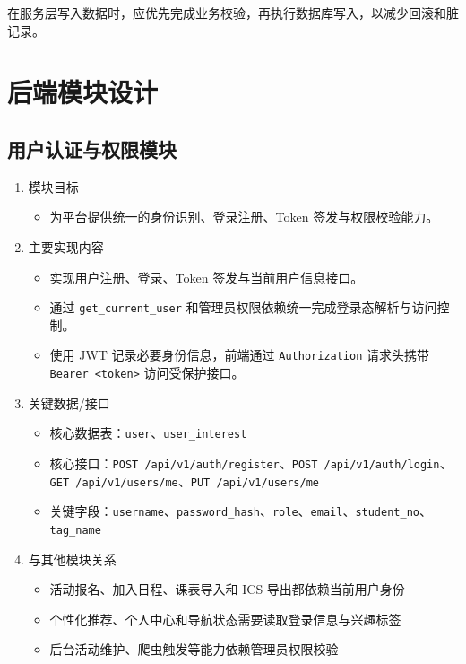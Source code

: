 \documentclass[UTF8,a4paper,12pt,fontset=none]{ctexrep}
\providecommand{\tightlist}{}
\begin{document}
在服务层写入数据时，应优先完成业务校验，再执行数据库写入，以减少回滚和脏记录。

\section{后端模块设计}\label{ux540eux7aefux6a21ux5757ux8bbeux8ba1}

\subsection{用户认证与权限模块}\label{ux7528ux6237ux8ba4ux8bc1ux4e0eux6743ux9650ux6a21ux5757}

\begin{enumerate}
\def\labelenumi{\arabic{enumi}.}
\item
  模块目标

  \begin{itemize}
  \tightlist
  \item
    为平台提供统一的身份识别、登录注册、Token 签发与权限校验能力。
  \end{itemize}
\item
  主要实现内容

  \begin{itemize}
  \tightlist
  \item
    实现用户注册、登录、Token 签发与当前用户信息接口。
  \item
    通过 \texttt{get\_current\_user} 和管理员权限依赖统一完成登录态解析与访问控制。
  \item
    使用 JWT 记录必要身份信息，前端通过 \texttt{Authorization} 请求头携带 \texttt{Bearer <token>} 访问受保护接口。
  \end{itemize}
\item
  关键数据/接口

  \begin{itemize}
  \tightlist
  \item
    核心数据表：\texttt{user}、\texttt{user\_interest}
  \item
    核心接口：\texttt{POST\ /api/v1/auth/register}、\texttt{POST\ /api/v1/auth/login}、\texttt{GET\ /api/v1/users/me}、\texttt{PUT\ /api/v1/users/me}
  \item
    关键字段：\texttt{username}、\texttt{password\_hash}、\texttt{role}、\texttt{email}、\texttt{student\_no}、\texttt{tag\_name}
  \end{itemize}
\item
  与其他模块关系

  \begin{itemize}
  \tightlist
  \item
    活动报名、加入日程、课表导入和 ICS 导出都依赖当前用户身份
  \item
    个性化推荐、个人中心和导航状态需要读取登录信息与兴趣标签
  \item
    后台活动维护、爬虫触发等能力依赖管理员权限校验
  \end{itemize}
\end{enumerate}
\end{document}
